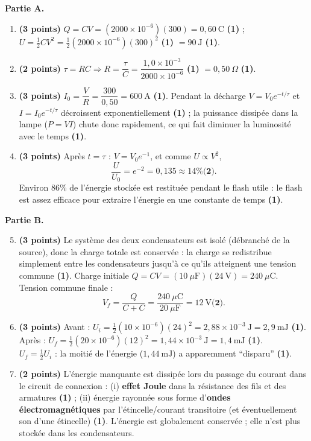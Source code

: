 \documentclass[11pt]{article}
\begin{document}
\begin{corrige}
\textbf{Partie A.}
\begin{enumerate}
\item \textbf{(3 points)} $Q = CV = (2000\times10^{-6})(300) = 0,60\ \mathrm{C}$ \textbf{(1)} ; $U = \tfrac{1}{2}CV^2 = \tfrac{1}{2}(2000\times10^{-6})(300)^2$ \textbf{(1)} $= 90\ \mathrm{J}$ \textbf{(1)}.
\item \textbf{(2 points)} $\tau = RC \Rightarrow R = \dfrac{\tau}{C} = \dfrac{1,0\times10^{-3}}{2000\times10^{-6}}$ \textbf{(1)} $= 0,50\ \Omega$ \textbf{(1)}.
\item \textbf{(3 points)} $I_0 = \dfrac{V}{R} = \dfrac{300}{0,50} = 600\ \mathrm{A}$ \textbf{(1)}. Pendant la décharge $V = V_0 e^{-t/\tau}$ et $I = I_0 e^{-t/\tau}$ décroissent exponentiellement \textbf{(1)} ; la puissance dissipée dans la lampe ($P = VI$) chute donc rapidement, ce qui fait diminuer la luminosité avec le temps \textbf{(1)}.
\item \textbf{(3 points)} Après $t = \tau$ : $V = V_0 e^{-1}$, et comme $U \propto V^2$,
\[ \frac{U}{U_0} = e^{-2} = 0,135 \approx 14\% \textbf{(2)}. \]
Environ $86\%$ de l'énergie stockée est restituée pendant le flash utile : le flash est assez efficace pour extraire l'énergie en une constante de temps \textbf{(1)}.
\end{enumerate}
\textbf{Partie B.}
\begin{enumerate}
\setcounter{enumi}{4}
\item \textbf{(3 points)} Le système des deux condensateurs est isolé (débranché de la source), donc la charge totale est conservée : la charge se redistribue simplement entre les condensateurs jusqu'à ce qu'ils atteignent une tension commune \textbf{(1)}. Charge initiale $Q = CV = (10\ \mu\mathrm{F})(24\ \mathrm{V}) = 240\ \mu\mathrm{C}$. Tension commune finale :
\[ V_f = \frac{Q}{C + C} = \frac{240\ \mu\mathrm{C}}{20\ \mu\mathrm{F}} = 12\ \mathrm{V} \textbf{(2)}. \]
\item \textbf{(3 points)} Avant : $U_i = \tfrac{1}{2}(10\times10^{-6})(24)^2 = 2,88\times10^{-3}\ \mathrm{J} = 2,9\ \mathrm{mJ}$ \textbf{(1)}.\\
Après : $U_f = \tfrac{1}{2}(20\times10^{-6})(12)^2 = 1,44\times10^{-3}\ \mathrm{J} = 1,4\ \mathrm{mJ}$ \textbf{(1)}.\\
$U_f = \tfrac{1}{2}U_i$ : la moitié de l'énergie ($1,44\ \mathrm{mJ}$) a apparemment ``disparu'' \textbf{(1)}.
\item \textbf{(2 points)} L'énergie manquante est dissipée lors du passage du courant dans le circuit de connexion : (i) \textbf{effet Joule} dans la résistance des fils et des armatures \textbf{(1)} ; (ii) énergie rayonnée sous forme d'\textbf{ondes électromagnétiques} par l'étincelle/courant transitoire (et éventuellement son d'une étincelle) \textbf{(1)}. L'énergie est globalement conservée ; elle n'est plus stockée dans les condensateurs.\\

\end{enumerate}
\end{corrige}
\end{document}
